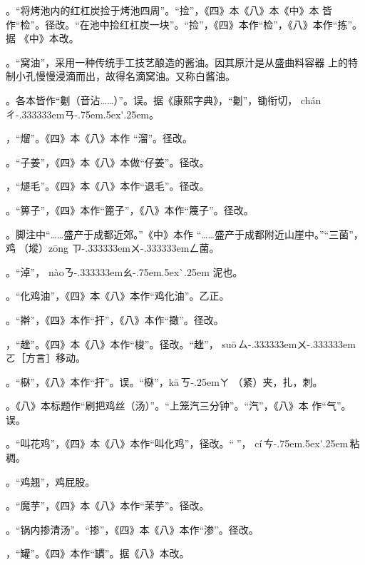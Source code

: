 。“将烤池内的红杠炭捡于烤池四周”。“捡”，《四》本《八》本《中》本
皆作“检”。径改。“在池中捡红杠炭一块”。“捡”，《四》本作“检”，《八》本作“拣”。据
《中》本改。

。“窝油”，采用一种传统手工技艺酿造的酱油。因其原汁是从盛曲料容器
上的特制小孔慢慢浸滴而出，故得名滴窝油。又称白酱油。

。各本皆作“劖（音沾……）”。误。据《康熙字典》，“劖”，锄衔切，
{ch\'{a}n}{ㄔ\kern-.333333emㄢ\kern-.75em\raise.5ex\hbox{\'{}}\kern.25em}。

，“熘”。《四》本《八》本作
“溜”。径改。

。“子姜”，《四》本《八》本做“仔姜”。径改。

，“煺毛”。《四》本《八》本作“退毛”。径改。

。“箅子”，《四》本作“篦子”，《八》本作“篾子”。径改。

。脚注{\footnotesize{}}中“……盛产于成都近郊。”《中》本作
“……盛产于成都附近山崖中。”“三菌”，鸡𭎂（㙡）{z\={o}ng}%
{ㄗ\kern-.333333emㄨ\kern-.333333emㄥ}菌。

。“淖”，
{n\`{a}o}{ㄋ\kern-.333333emㄠ\kern-.75em\raise.5ex\hbox{\`{}}\kern.25em} 泥也。

。“化鸡油”，《四》本《八》本作“鸡化油”。乙正。

。“擀”，《四》本作“扞”，《八》本作“撖”。径改。

，“趖”。《四》本《八》本作“梭”。径改。“趖”，
{su\={o}}\,{ㄙ\kern-.333333emㄨ\kern-.333333emㄛ}［方言］移动。

。“㮟”，《八》本作“扞”。误。“㮟”，{k\={a}}\,{ㄎ\kern-.25emㄚ}
（紧）夹，扎，刺。

。《八》本标题作“刷把鸡丝（汤）”。“上笼汽三分钟”。“汽”，《八》本
作“气”。误。

。“叫花鸡”，《四》本《八》本作“叫化鸡”，径改。“𫃕”，%
{c\'{i}}\,{ㄘ\kern-.75em\raise.5ex\hbox{\'{}}\kern.25em}\,粘稠。

。“鸡翘”，鸡屁股。

。“魔芋”，《四》本《八》本作“茉芋”。径改。

。“锅内掺清汤”。“掺”，《四》本《八》本作“渗”。径改。

，“罐”。《四》本作“罆”。据《八》本改。

